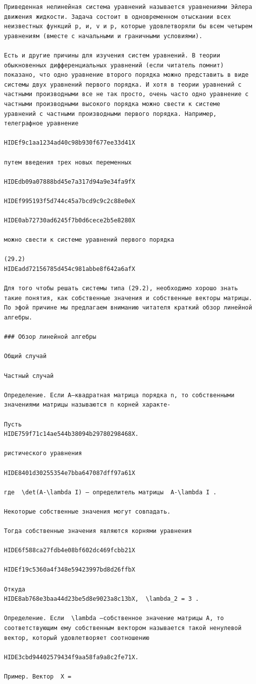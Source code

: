 \documentclass[
  ukrainian,
]{article}
\begin{document}
\begin{verbatim}
Приведенная нелинейная система уравнений называется уравнениями Эйлера движения жидкости. Задача состоит в одновременном отыскании всех неизвестных функций р, и, v и р, которые удовлетворяли бы всем четырем уравнениям (вместе с начальными и граничными условиями).

Есть и другие причины для изучения систем уравнений. В теории обыкновенных дифференциальных уравнений (если читатель помнит) показано, что одно уравнение второго порядка можно представить в виде системы двух уравнений первого порядка. И хотя в теории уравнений с частными производными все не так просто, очень часто одно уравнение с частными производными высокого порядка можно свести к системе уравнений с частными производными первого порядка. Например, телеграфное уравнение

HIDEf9c1aa1234ad40c98b930f677ee33d41X

путем введения трех новых переменных

HIDEdb09a07888bd45e7a317d94a9e34fa9fX

HIDEf995193f5d744c45a7bcd9c9c2c88e0eX

HIDE0ab72730ad6245f7b0d6cece2b5e8280X

можно свести к системе уравнений первого порядка

(29.2) 
HIDEadd72156785d454c981abbe8f642a6afX

Для того чтобы решать системы типа (29.2), необходимо хорошо знать такие понятия, как собственные значения и собственные векторы матрицы. По эфой причине мы предлагаем вниманию читателя краткий обзор линейной алгебры.

### Обзор линейной алгебры

Общий случай

Частный случай

Определение. Если А—квадратная матрица порядка n, то собственными значениями матрицы называются n корней характе-

Пусть 
HIDE759f71c14ae544b38094b29780298468X.

ристического уравнения

HIDE8401d30255354e7bba647087dff97a61X

где  \det(A-\lambda I) — определитель матрицы  A-\lambda I .

Некоторые собственные значения могут совпадать.

Тогда собственные значения являются корнями уравнения

HIDE6f588ca27fdb4e08bf602dc469fcbb21X

HIDEf19c5360a4f348e59423997bd8d26ffbX

Откуда 
HIDE8ab768e3baa44d23be5d8e9023a8c13bX,  \lambda_2 = 3 .

Определение. Если  \lambda —собственное значение матрицы A, то соответствующим ему собственным вектором называется такой ненулевой вектор, который удовлетворяет соотношению

HIDE3cbd94402579434f9aa58fa9a8c2fe71X.

Пример. Вектор  X =
\end{verbatim}
\end{document}
